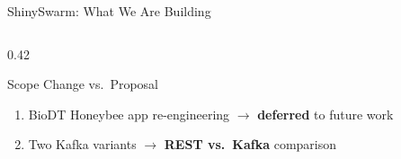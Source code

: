 \documentclass[aspectratio=169]{beamer}
\begin{document}
\begin{frame}{ShinySwarm: What We Are Building}
\begin{columns}[T]
\begin{column}{0.42\textwidth}
\vspace{0.5em}
\begin{block}{Scope Change vs.\ Proposal}
\small
\begin{enumerate}
    \item BioDT Honeybee app re-engineering $\rightarrow$ \textbf{deferred} to future work
    \item Two Kafka variants $\rightarrow$ \textbf{REST vs.\ Kafka} comparison
\end{enumerate}
\end{block}

\end{column}
\end{columns}

\end{frame}

\end{document}
